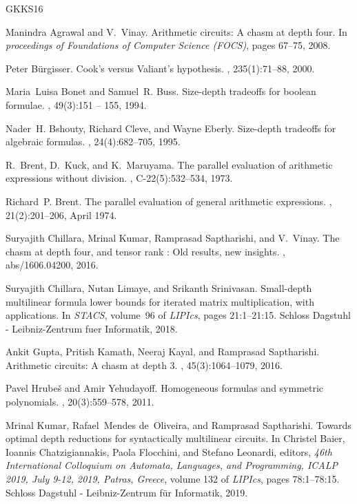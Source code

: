 \documentclass[10pt,a4paper]{article}
\begin{document}
\begin{thebibliography}{GKKS16}

Manindra Agrawal and V.~Vinay.
\newblock Arithmetic circuits: A chasm at depth four.
\newblock In {\em proceedings of Foundations of Computer Science (FOCS)}, pages
  67--75, 2008.

Peter B\"{u}rgisser.
\newblock Cook's versus {V}aliant's hypothesis.
, 235(1):71--88, 2000.

Maria~Luisa Bonet and Samuel~R. Buss.
\newblock Size-depth tradeoffs for boolean formulae.
, 49(3):151 -- 155, 1994.

Nader~H. Bshouty, Richard Cleve, and Wayne Eberly.
\newblock Size-depth tradeoffs for algebraic formulas.
, 24(4):682--705, 1995.

R.~Brent, D.~Kuck, and K.~Maruyama.
\newblock The parallel evaluation of arithmetic expressions without division.
, C-22(5):532--534, 1973.

Richard~P. Brent.
\newblock The parallel evaluation of general arithmetic expressions.
, 21(2):201--206, April 1974.

Suryajith Chillara, Mrinal Kumar, Ramprasad Saptharishi, and V.~Vinay.
\newblock The chasm at depth four, and tensor rank : Old results, new insights.
, abs/1606.04200, 2016.

Suryajith Chillara, Nutan Limaye, and Srikanth Srinivasan.
\newblock Small-depth multilinear formula lower bounds for iterated matrix
  multiplication, with applications.
\newblock In {\em {STACS}}, volume~96 of {\em LIPIcs}, pages 21:1--21:15.
  Schloss Dagstuhl - Leibniz-Zentrum fuer Informatik, 2018.

Ankit Gupta, Pritish Kamath, Neeraj Kayal, and Ramprasad Saptharishi.
\newblock Arithmetic circuits: {A} chasm at depth 3.
, 45(3):1064--1079, 2016.

Pavel Hrube\v{s} and Amir Yehudayoff.
\newblock Homogeneous formulas and symmetric polynomials.
, 20(3):559--578, 2011.

Mrinal Kumar, Rafael~Mendes de~Oliveira, and Ramprasad Saptharishi.
\newblock Towards optimal depth reductions for syntactically multilinear
  circuits.
\newblock In Christel Baier, Ioannis Chatzigiannakis, Paola Flocchini, and
  Stefano Leonardi, editors, {\em 46th International Colloquium on Automata,
  Languages, and Programming, {ICALP} 2019, July 9-12, 2019, Patras, Greece},
  volume 132 of {\em LIPIcs}, pages 78:1--78:15. Schloss Dagstuhl -
  Leibniz-Zentrum f{\"{u}}r Informatik, 2019.


\end{thebibliography}
\end{document}
